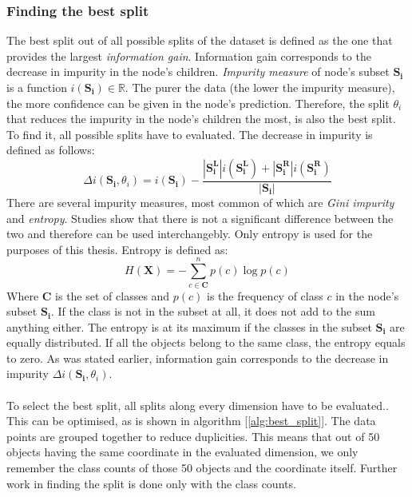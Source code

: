 \documentclass[11pt]{article}
\begin{document}
      \subsubsection{Finding the best split}
        The best split out of all possible splits of the dataset is defined as the one that provides the largest {\it information gain}. Information gain corresponds to the decrease in impurity in the node's children. {\it Impurity measure} of node's subset $\mathbf{S_i}$ is a function $i(\mathbf{S_i}) \in \mathbb{R}$. The purer the data (the lower the impurity measure), the more confidence can be given in the node's prediction. Therefore, the split $\theta_i$ that reduces the impurity in the node's children the most, is also the best split. To find it, all possible splits have to evaluated. The decrease in impurity is defined as follows:
        \begin{equation}
          \Delta i(\mathbf{S_i}, \theta_i) = i(\mathbf{S_i}) - \frac{|\mathbf{S_i^L}|i(\mathbf{S_i^L}) + |\mathbf{S_i^R}|i(\mathbf{S_i^R})}{|\mathbf{S_i}|}
        \end{equation}
        There are several impurity measures, most common of which are {\it Gini impurity} and {\it entropy}. Studies show that there is not a significant difference between the two and therefore can be used interchangebly.\cite{gini} Only entropy is used for the purposes of this thesis. Entropy is defined as:
        \begin{equation}
          H(\mathbf{X}) = - \sum_{c \in \mathbf{C}}^{n} p(c)\log{p(c)}
        \end{equation}
        Where $\mathbf{C}$ is the set of classes and $p(c)$ is the frequency of class $c$ in the node's subset $\mathbf{S_i}$.\cite{brabec} If the class is not in the subset at all, it does not add to the sum anything either. The entropy is at its maximum if the classes in the subset $\mathbf{S_i}$ are equally distributed. If all the objects belong to the same class, the entropy equals to zero. As was stated earlier, information gain corresponds to the decrease in impurity $\Delta i(\mathbf{S_i}, \theta_i)$.\cite{brabec}
        \\~\\
        To select the best split, all splits along every dimension have to be evaluated.\cite{brabec}. This can be optimised, as is shown in algorithm [\ref{alg:best_split}]. The data points are grouped together to reduce duplicities. This means that out of 50 objects having the same coordinate in the evaluated dimension, we only remember the class counts of those 50 objects and the coordinate itself. Further work in finding the split is done only with the class counts.\cite{brabec}
\end{document}
